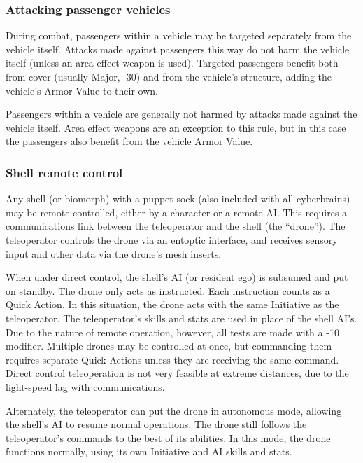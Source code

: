 \subsubsection{Attacking passenger vehicles} 

During combat, passengers within a vehicle may be targeted separately from the vehicle itself. Attacks made against passengers this way do not harm the vehicle itself (unless an area effect weapon is used). Targeted passengers benefit both from cover (usually Major, -30) and from the vehicle’s structure, adding the vehicle’s Armor Value to their own. 

Passengers within a vehicle are generally not harmed by attacks made against the vehicle itself. Area effect weapons are an exception to this rule, but in this case the passengers also benefit from the vehicle Armor Value. 

\subsubsection{Shell remote control} 

Any shell (or biomorph) with a puppet sock (also included with all cyberbrains) may be remote controlled, either by a character or a remote AI. This requires a communications link between the teleoperator and the shell (the ``drone”). The teleoperator controls the drone via an entoptic interface, and receives sensory input and other data via the drone’s mesh inserts. 

When under direct control, the shell’s AI (or resident ego) is subsumed and put on standby. The drone only acts as instructed. Each instruction counts as a Quick Action. In this situation, the drone acts with the same Initiative as the teleoperator. The teleoperator’s skills and stats are used in place of the shell AI’s. Due to the nature of remote operation, however, all tests are made with a -10 modifier. Multiple drones may be controlled at once, but commanding them requires separate Quick Actions unless they are receiving the same command. Direct control teleoperation is not very feasible at extreme distances, due to the light-speed lag with communications. 

Alternately, the teleoperator can put the drone in autonomous mode, allowing the shell’s AI to resume normal operations. The drone still follows the teleoperator’s commands to the best of its abilities. In this mode, the drone functions normally, using its own Initiative and AI skills and stats. 

